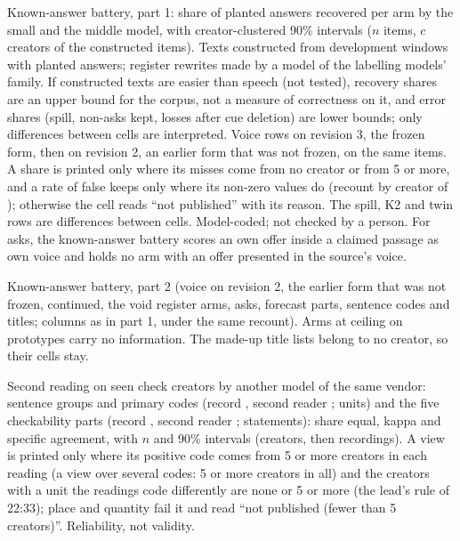 \begin{table}[tp]
\centering
\small

\caption{Known-answer battery, part 1: share of planted answers recovered per arm by the small and the middle model,
with creator-clustered 90\% intervals ($n$ items, $c$ creators of the constructed items). Texts constructed from
development windows with planted answers; register rewrites made by a model of the labelling models' family. If
constructed texts are easier than speech (not tested), recovery shares are an upper bound for the corpus, not a measure of correctness
on it, and error shares (spill, non-asks kept, losses after cue deletion) are lower bounds; only differences between
cells are interpreted. Voice rows on revision 3, the frozen form, then on revision 2, an earlier form that was not frozen, on the same items. A share is
printed only where its misses come from no creator or from 5 or more, and a rate of false keeps only where its non-zero
values do (recount by creator of \RecountStamp); otherwise the cell reads ``not published'' with its reason. The spill,
K2 and twin rows are differences between cells. Model-coded; not checked by a person. For asks, the known-answer battery scores an own offer inside a claimed passage as own voice and holds no arm with an offer presented in the source's voice. \LabelValidity}
\label{tab:ka}
\end{table}

\begin{table}[tp]
\centering
\small

\caption{Known-answer battery, part 2 (voice on revision 2, the earlier form that was not frozen, continued, the void register arms, asks, forecast parts,
sentence codes and titles; columns as in part 1, under the same recount). Arms at ceiling on prototypes carry no
information. The made-up title lists belong to no creator, so their cells stay. \LabelValidity}
\label{tab:ka-b}
\end{table}

\begin{table}[t]
\centering
\small

\caption{Second reading on seen check creators by another model of the same vendor: sentence groups and primary codes
(record \ModelSmall, second reader \ModelMiddle; \DblSUnits{} units) and the five checkability parts (record
\ModelMiddle, second reader \ModelLarge; \DblFcUnits{} statements): share equal, kappa and specific agreement, with $n$
and 90\% intervals (creators, then recordings). A view is printed only where its positive code comes from 5 or more
creators in each reading (a view over several codes: 5 or more creators in all) and the creators with a unit the
readings code differently are none or 5 or more (the lead's rule of 22:33); place and quantity fail it and read ``not
published (fewer than 5 creators)''. Reliability, not validity. \LabelValidity}
\label{tab:doubleread}
\end{table}


